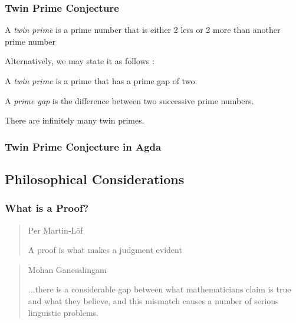 \documentclass[10pt]{beamer}
\begin{document}
\begin{frame}
\frametitle{Twin Prime Conjecture}
\begin{Definition}
A \emph{twin prime} is a prime number that is either 2 less or 2 more than another prime number
\end{Definition}
Alternatively, we may state it as follows :
\begin{Definition}
A \emph{twin prime} is a prime that has a prime gap of two.
\end{Definition}
\begin{Definition}
A \emph{prime gap} is the difference between two successive prime numbers.
\end{Definition}

\begin{theorem}
There are infinitely many twin primes.
\end{theorem}

\end{frame}

\begin{frame}

\frametitle{Twin Prime Conjecture in Agda}

% 

\end{frame}

\subsection{Philosophical Considerations}

\begin{frame}

\frametitle{What is a Proof?}

\begin{quote}{Per Martin-Löf}

A proof is what makes a judgment evident %

\end{quote}


\end{frame}


\begin{frame}


\begin{quote}{Mohan Ganesalingam}

...there is a considerable gap between what mathematicians claim is true and what
they believe, and this mismatch causes a number of serious linguistic problems.

\end{quote}

\end{frame}
\end{document}
